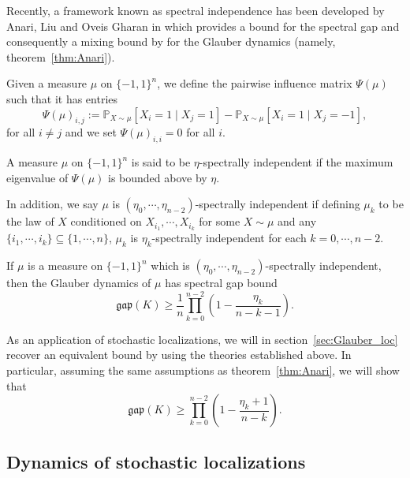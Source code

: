 Recently, a framework known as spectral independence has been developed by Anari, Liu and Oveis Gharan in 
\cite{Anari_2020} which provides a bound for the spectral gap and consequently a mixing bound by 
for the Glauber dynamics (namely, theorem~\ref{thm:Anari}). 

\begin{definition}
  Given a measure \(\mu\) on \(\{-1, 1\}^n\), we define the pairwise influence matrix \(\Psi(\mu)\) 
  such that it has entries 
  \[\Psi(\mu)_{i, j} := \mathbb{P}_{X \sim \mu}[X_i = 1 \mid X_j = 1] - \mathbb{P}_{X \sim \mu}[X_i = 1 \mid X_j = -1],\]
  for all \(i \neq j\) and we set \(\Psi(\mu)_{i, i} = 0\) for all \(i\).
\end{definition}

\begin{definition}
  A measure \(\mu\) on \(\{-1, 1\}^n\) is said to be \(\eta\)-spectrally independent if 
  the maximum eigenvalue of \(\Psi(\mu)\) is bounded above by \(\eta\).

  In addition, we say \(\mu\) is \((\eta_0, \cdots, \eta_{n - 2})\)-spectrally independent if defining 
  \(\mu_k\) to be the law of \(X\) conditioned on \(X_{i_1}, \cdots, X_{i_k}\) for some \(X \sim \mu\) and 
  any \(\{i_1, \cdots, i_k\} \subseteq \{1, \cdots, n\}\), \(\mu_k\) is \(\eta_k\)-spectrally independent 
  for each \(k = 0, \cdots, n - 2\).
\end{definition}

\begin{theorem}\label{thm:Anari}
  If \(\mu\) is a measure on \(\{-1, 1\}^n\) which is \((\eta_0, \cdots, \eta_{n - 2})\)-spectrally 
  independent, then the Glauber dynamics of \(\mu\) has spectral gap bound 
  \[\mathfrak{gap}(K) \ge \frac{1}{n} \prod_{k = 0}^{n - 2}\left(1 - \frac{\eta_k}{n - k - 1}\right).\]
\end{theorem}

As an application of stochastic localizations, we will in section~\ref{sec:Glauber_loc} recover an equivalent 
bound by using the theories established above. In particular, assuming the same assumptions as theorem~\ref{thm:Anari},
we will show that 
\[\mathfrak{gap}(K) \ge \prod_{k = 0}^{n - 2}\left(1 - \frac{\eta_k + 1}{n - k}\right).\]
\subsection{Dynamics of stochastic localizations}

